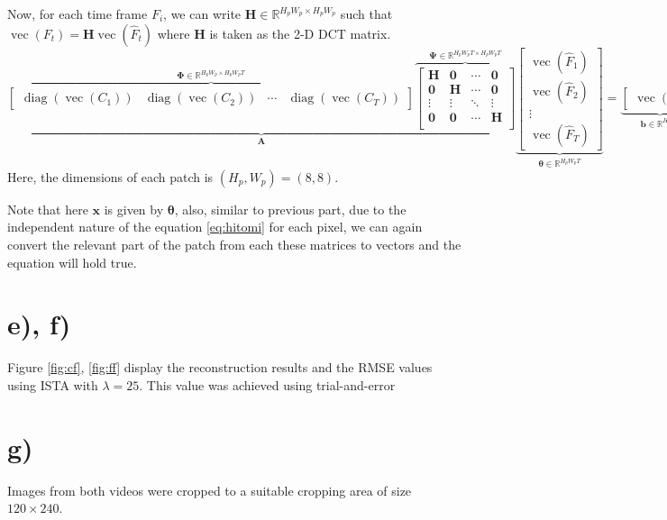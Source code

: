 \documentclass[a4paper, landscape]{article}
\newcommand{\op}{\operatorname}
\begin{document}
Now, for each time frame $F_i$, we can write $\bm{H}\in\mathbb{R}^{H_pW_p\times H_pW_p}$ such that $\op{vec}(F_t) = \bm{H}\op{vec}(\hat{F}_t)$ where $\bm{H}$ is taken as the 2-D DCT matrix.
\begin{equation}
\underbrace{
	\overbrace{
		\begin{bmatrix}
			\op{diag}(\op{vec}(C_1)) & \op{diag}(\op{vec}(C_2)) & \cdots & \op{diag}(\op{vec}(C_T))
		\end{bmatrix}
	}^{\bm{\Phi}\in\mathbb{R}^{H_pW_p\times H_pW_pT}}
	\overbrace{
		\begin{bmatrix}
			\bm{H} & \bm{0} & \cdots & \bm{0}\\
			\bm{0} & \bm{H} & \cdots & \bm{0}\\
			\vdots & \vdots & \ddots & \vdots\\
			\bm{0} & \bm{0} & \cdots & \bm{H}\\
		\end{bmatrix}
	}^{\bm{\Psi}\in\mathbb{R}^{H_pW_pT\times H_pW_pT}}
}_{\bm{A}}
\underbrace{
	\begin{bmatrix}
	\op{vec}(\hat{F}_1) \\ \op{vec}(\hat{F}_2) \\ \vdots \\ \op{vec}(\hat{F}_T)
	\end{bmatrix}
}_{\bm{\theta}\in\mathbb{R}^{H_pW_pT}}
=
\underbrace{
	\begin{bmatrix}
	\op{vec}(I)
	\end{bmatrix}
}_{\bm{b}\in\mathbb{R}^{H_pW_p}}
\end{equation}
Here, the dimensions of each patch is $(H_p, W_p)=(8,8)$.

Note that here $\bm{x}$ is given by $\bm{\theta}$, also, similar to previous part, due to the independent nature of the equation \ref{eq:hitomi} for each pixel, we can again convert the relevant part of the patch from each these matrices to vectors and the equation will hold true.
\section*{e), f)}
Figure \ref{fig:cf}, \ref{fig:ff} display the reconstruction results and the RMSE values using ISTA with $\lambda=25$. This value was achieved using trial-and-error
\section*{g)}
Images from both videos were cropped to a suitable cropping area of size $120\times240$.
\end{document}

